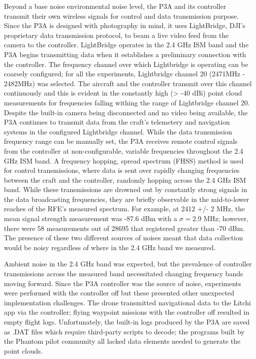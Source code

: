 \documentclass[pageno]{jpaper}
\begin{document}
Beyond a base noise environmental noise level, the P3A and its controller transmit their own wireless signals for control and data transmission purpose. Since the P3A is designed with photography in mind, it uses LightBridge, DJI's proprietary data transmission protocol, to beam a live video feed from the camera to the controller. LightBridge operates in the 2.4 GHz ISM band and the P3A begins transmitting data when it establishes a preliminary connection with the controller. The frequency channel over which Lightbridge is operating can be coarsely configured; for all the experiments, Lightbridge channel 20 (2471MHz - 2482MHz) was selected. The aircraft and the controller transmit over this channel continuously and this is evident in the constantly high (> -40 dBi) point cloud measurements for frequencies falling withing the range of Lightbridge channel 20. Despite the built-in camera being disconnected and no video being available, the P3A continues to transmit data from the craft's telemetery and navigation systems in the configured Lightbridge channel. While the data transmission frequency range can be manually set, the P3A receives remote control signals from the controller at non-configurable, variable frequencies throughout the 2.4 GHz ISM band. A frequency hopping, spread spectrum (FHSS) method is used for control transmissions, where data is sent over rapidly changing frequencies between the craft and the controller, randomly hopping across the 2.4 GHz ISM band. While these transmissions are drowned out by constantly strong signals in the data broadcasting frequencies, they are briefly observable in the mid-to-lower reaches of the RFE's measured spectrum. For example, at 2412 +/- 2 MHz, the mean signal strength measurement was -87.6 dBm with a $\sigma =$2.9 MHz; however, there were 58 measurements out of 28695 that registered greater than -70 dBm. The presence of these two different sources of noises meant that data collection would be noisy regardless of where in the 2.4 GHz band we measured.

Ambient noise in the 2.4 GHz band was expected, but the prevalence of controller transmissions across the measured band necessitated changing frequency bands moving forward. Since the P3A controller was the source of noise, experiments were performed with the controller off but these presented other unexpected implementation challenges. The drone transmitted navigational data to the Litchi app via the controller; flying waypoint missions with the controller off resulted in empty flight logs. Unfortunately, the built-in logs produced by the P3A are saved as .DAT files which require third-party scripts to decode; the programs built by the Phantom pilot community all lacked data elements needed to generate the point clouds. 
\end{document}
